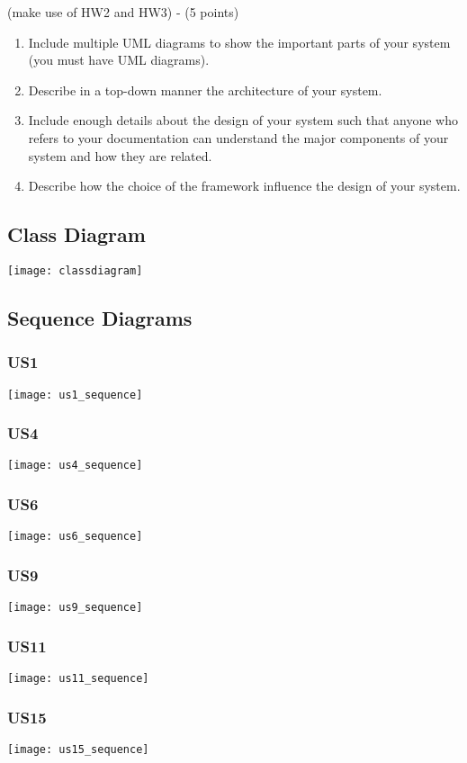 (make use of HW2 and HW3) - (5 points)

\begin{enumerate}
	\item Include multiple UML diagrams to show the important parts of your system (you must have UML diagrams).
	\item Describe in a top-down manner the architecture of your system.
	\item Include enough details about the design of your system such that anyone who refers to your documentation can understand the major components of your system and how they are related.
	\item Describe how the choice of the framework influence the design of your system.
\end{enumerate}

\subsection{Class Diagram}
\texttt{[image: classdiagram]}

\subsection{Sequence Diagrams}
\subsubsection{US1}
\texttt{[image: us1\_sequence]}

\subsubsection{US4}
\texttt{[image: us4\_sequence]}

\subsubsection{US6}
\texttt{[image: us6\_sequence]}

\subsubsection{US9}
\texttt{[image: us9\_sequence]}

\subsubsection{US11}
\texttt{[image: us11\_sequence]}

\subsubsection{US15}
\texttt{[image: us15\_sequence]}
